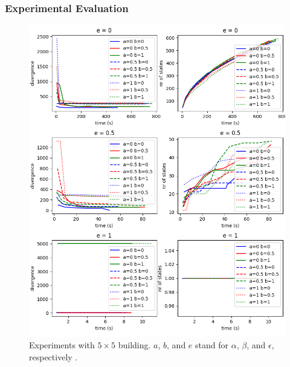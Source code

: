 \documentclass{beamer}
\begin{document}
\begin{frame}
\frametitle{Experimental Evaluation}
\vspace*{-0.5cm}
\begin{figure}
\centering
\includegraphics[width=0.7\columnwidth]{big_exp.png}
\caption{Experiments with $5\times5$ building. $a$, $b$, and $e$ stand for $\alpha$, $\beta$, and $\epsilon$, respectively \label{fig:big_experiments}.}
\end{figure}

\end{frame}
\end{document}
